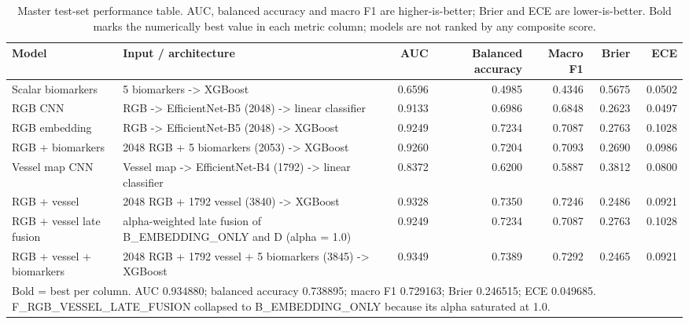 \begin{table}[htbp]
\centering
\small
\caption{Master test-set performance table. AUC, balanced accuracy and macro F1 are higher-is-better; Brier and ECE are lower-is-better. Bold marks the numerically best value in each metric column; models are not ranked by any composite score.}
\label{tab:master}
\begin{tabular}{p{4.2cm}p{5.4cm}rrrrr}
\toprule
Model & Input / architecture & AUC & Balanced accuracy & Macro F1 & Brier & ECE \\
\midrule
Scalar biomarkers & 5 biomarkers -> XGBoost & 0.6596 & 0.4985 & 0.4346 & 0.5675 & 0.0502 \\
RGB CNN & RGB -> EfficientNet-B5 (2048) -> linear classifier & 0.9133 & 0.6986 & 0.6848 & 0.2623 & 0.0497 \\
RGB embedding & RGB -> EfficientNet-B5 (2048) -> XGBoost & 0.9249 & 0.7234 & 0.7087 & 0.2763 & 0.1028 \\
RGB + biomarkers & 2048 RGB + 5 biomarkers (2053) -> XGBoost & 0.9260 & 0.7204 & 0.7093 & 0.2690 & 0.0986 \\
Vessel map CNN & Vessel map -> EfficientNet-B4 (1792) -> linear classifier & 0.8372 & 0.6200 & 0.5887 & 0.3812 & 0.0800 \\
RGB + vessel & 2048 RGB + 1792 vessel (3840) -> XGBoost & 0.9328 & 0.7350 & 0.7246 & 0.2486 & 0.0921 \\
RGB + vessel late fusion & alpha-weighted late fusion of B\_EMBEDDING\_ONLY and D (alpha = 1.0) & 0.9249 & 0.7234 & 0.7087 & 0.2763 & 0.1028 \\
RGB + vessel + biomarkers & 2048 RGB + 1792 vessel + 5 biomarkers (3845) -> XGBoost & 0.9349 & 0.7389 & 0.7292 & 0.2465 & 0.0921 \\
\bottomrule
\multicolumn{7}{l}{\footnotesize Bold = best per column. AUC 0.934880; balanced accuracy 0.738895; macro F1 0.729163; Brier 0.246515; ECE 0.049685. F\_RGB\_VESSEL\_LATE\_FUSION collapsed to B\_EMBEDDING\_ONLY because its alpha saturated at 1.0.} \\
\end{tabular}
\end{table}
